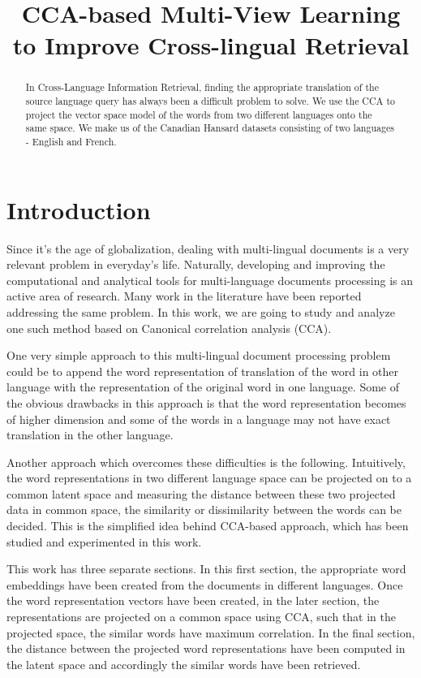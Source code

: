 \documentclass{article} %
\title{CCA-based Multi-View Learning to Improve Cross-lingual Retrieval}
\begin{document}
	
	
	\maketitle
	
	\begin{abstract}
		In Cross-Language Information Retrieval, finding the appropriate translation of the source language query has always been a difficult problem to solve. We use the CCA to project the  vector space model of the words from two different languages onto the same space. We make us of the Canadian Hansard datasets consisting of two languages - English and French.
	\end{abstract}
	
	\section{Introduction}
	
	Since it's the age of globalization, dealing with multi-lingual documents is a very relevant problem in everyday's life. Naturally, developing and improving the computational and analytical tools for multi-language documents processing is an active area of research. Many work in the literature have been reported addressing the same problem. In this work, we are going to study and analyze one such method based on Canonical correlation analysis (CCA).
	
	One very simple approach to this multi-lingual document processing problem could be to append the word representation of translation of the word in other language with the representation of the original word in one language. Some of the obvious drawbacks in this approach is that the word representation becomes of higher dimension and some of the words in a language may not have exact translation in the other language.
	
	Another approach which overcomes these difficulties is the following. Intuitively, the word representations in two different language space can be projected on to a common latent space and measuring the distance between these two projected data in common space, the similarity or dissimilarity between the words can be decided. This is the simplified idea behind CCA-based approach, which has been studied and experimented in this work.
	
	This work has three separate sections. In this first section, the appropriate word embeddings have been created from the documents in different languages. Once the word representation vectors have been created, in the later section, the representations are projected on a common space using CCA, such that in the projected space, the similar words have maximum correlation. In the final section, the distance between the projected word representations have been computed in the latent space and accordingly the similar words have been retrieved.
	
\end{document}
